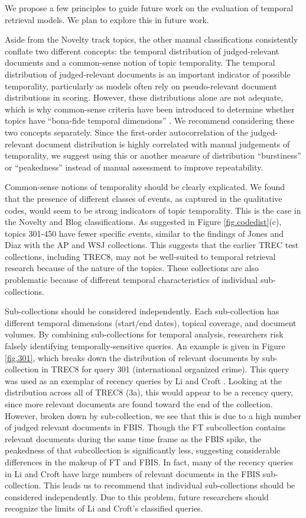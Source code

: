 \documentclass{sig-alternate}
\begin{document}
We propose a few principles to guide future work on the evaluation of temporal retrieval models. We plan to explore this in future work.

Aside from the Novelty track topics, the other manual classifications consistently conflate two different concepts: the temporal distribution of judged-relevant documents and a common-sense notion of topic temporality. The temporal distribution of judged-relevant documents is an important indicator of possible temporality, particularly as models often rely on pseudo-relevant document distributions in scoring. However, these distributions alone are not adequate, which is why common-sense criteria have been introduced to determine whether topics have ``bona-fide temporal dimensions'' \cite{Efron2011}. We recommend considering these two concepts separately.  Since the first-order autocorrelation of the judged-relevant document distribution is highly correlated with manual judgements of temporality, we suggest  using this or another measure of distribution ``burstiness'' or ``peakedness'' instead of manual assessment to improve repeatability.

Common-sense notions of temporality should be clearly explicated.  We found that the presence of different classes of events, as captured in the qualitative codes, would seem to be strong indicators of topic temporality.  This is the case in the Novelty and Blog classifications. As suggested in Figure \ref{fig.codedist}(c), topics 301-450 have fewer specific events, similar to the findings of Jones and Diaz with the AP and WSJ collections. This suggests that the earlier TREC test collections, including TREC8, may not be well-suited to temporal retrieval research because of the nature of the topics. These collections are also problematic because of different temporal characteristics of individual sub-collections.

Sub-collections should be considered independently. Each sub-collection has different temporal dimensions (start/end dates), topical coverage, and document volumes. By combining sub-collections for temporal analysis, researchers risk falsely identifying temporally-sensitive queries. An example is given in Figure \ref{fig.301}, which breaks down the distribution of relevant documents by sub-collection in TREC8 for query 301 (international organized crime). This query was used as an exemplar of recency queries by Li and Croft \cite{Li2003}. Looking at the distribution across all of TREC8 (3a), this would appear to be a recency query, since more relevant documents are found toward the end of the collection. However, broken down by sub-collection, we see that this is due to a high number of judged relevant documents in FBIS. Though the FT subcollection contains relevant documents during the same time frame as the FBIS spike, the peakedness of that subcollection is significantly less, suggesting considerable differences in the makeup of FT and FBIS. In fact, many of the recency queries in Li and Croft have large numbers of relevant documents in the FBIS sub-collection.  This leads us to recommend that individual sub-collections should be considered independently. Due to this problem, future researchers should recognize the limits of  Li and Croft's classified queries.
\end{document}
